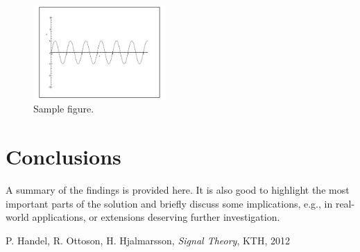 \documentclass[twocolumn, 12pt]{IEEEtran}
\begin{document}
\begin{figure}[t]
\begin{center}
\includegraphics[trim=1.8cm 5.1cm 2.8cm 4.9cm, clip=true, totalheight=0.2\textheight,width=0.45\textwidth]{Sinusoid.pdf}
\end{center}
\vspace{-0.4cm}
\caption {Sample figure.}
\label{fig:Fig1}
\end{figure}
\section{Conclusions}
A summary of the findings is provided here. It is also good to highlight the most important 
parts of the solution and briefly discuss some implications, e.g., in real-world applications,
or extensions deserving further investigation.

\begin{thebibliography}{1}

P. Handel, R. Ottoson, H. Hjalmarsson, \emph{Signal Theory}, KTH, 2012

\end{thebibliography}

\balance
\end{document}
